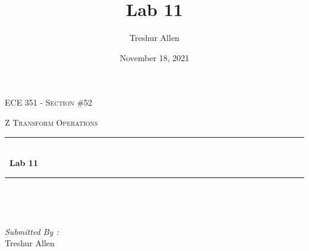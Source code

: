\documentclass[12pt]{report}
\title{Lab 11}
\author{ Treshur Allen}
\date{November 18, 2021}
\begin{document}

\begin{titlepage}
	\centering
    \vspace*{0.5 cm}
\begin{center}    \textsc{\Large   ECE 351 - Section \#52 }\\[2.0 cm]	\end{center}%
	\textsc{\Large Z Transform Operations }\\[0.5 cm]				%
	\rule{\linewidth}{0.2 mm} \\[0.4 cm]
	{ \huge \bfseries \ Lab 11}\\
	\rule{\linewidth}{0.2 mm} \\[1.5 cm]
	
	\begin{minipage}{0.4\textwidth}
		\begin{flushleft} \large
			\end{flushleft}
			\end{minipage}~
			\begin{minipage}{0.4\textwidth}
            
			\begin{flushright} \large
			\emph{Submitted By :} \\
			Treshur Allen  
		\end{flushright}
           
	\end{minipage}\\[2 cm]
	
    
    
    
    
	
\end{titlepage}


\tableofcontents
\pagebreak

\renewcommand{\thesection}{\arabic{section}}
\end{document}
